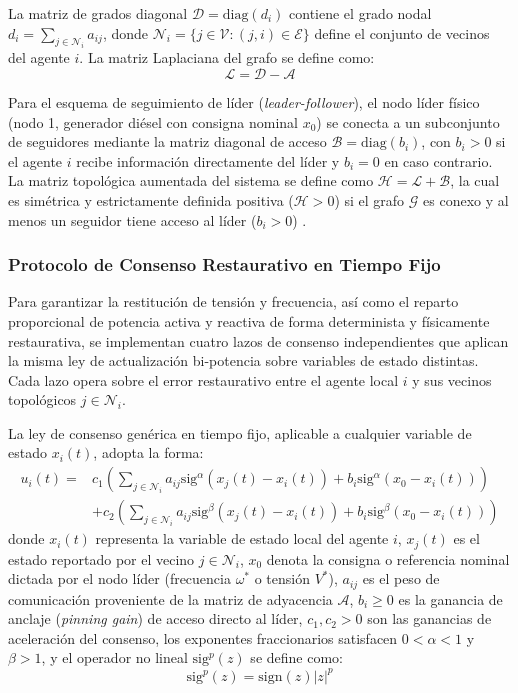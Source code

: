 La matriz de grados diagonal $\mathcal{D} = \text{diag}(d_i)$ contiene el grado nodal $d_i = \sum_{j \in \mathcal{N}_i} a_{ij}$, donde $\mathcal{N}_i = \{j \in \mathcal{V} : (j, i) \in \mathcal{E}\}$ define el conjunto de vecinos del agente $i$. La matriz Laplaciana del grafo se define como:
\[
\mathcal{L} = \mathcal{D} - \mathcal{A}
\]

Para el esquema de seguimiento de líder (\textit{leader-follower}), el nodo líder físico (nodo 1, generador diésel con consigna nominal $x_0$) se conecta a un subconjunto de seguidores mediante la matriz diagonal de acceso $\mathcal{B} = \text{diag}(b_i)$, con $b_i > 0$ si el agente $i$ recibe información directamente del líder y $b_i = 0$ en caso contrario. La matriz topológica aumentada del sistema se define como $\mathcal{H} = \mathcal{L} + \mathcal{B}$, la cual es simétrica y estrictamente definida positiva ($\mathcal{H} > 0$) si el grafo $\mathcal{G}$ es conexo y al menos un seguidor tiene acceso al líder ($b_i > 0$) \citep{Shrivastava2023FiniteTime}.

\subsubsection{Protocolo de Consenso Restaurativo en Tiempo Fijo}
Para garantizar la restitución de tensión y frecuencia, así como el reparto proporcional de potencia activa y reactiva de forma determinista y físicamente restaurativa, se implementan cuatro lazos de consenso independientes que aplican la misma ley de actualización bi-potencia sobre variables de estado distintas. Cada lazo opera sobre el error restaurativo entre el agente local $i$ y sus vecinos topológicos $j \in \mathcal{N}_i$.

La ley de consenso genérica en tiempo fijo, aplicable a cualquier variable de estado $x_i(t)$, adopta la forma:
\begin{equation}\label{eq:fixed_time_law}
\begin{split}
u_i(t) = &c_1 \left(\sum_{j \in \mathcal{N}_i} a_{ij} \text{sig}^\alpha(x_j(t) - x_i(t)) + b_i \text{sig}^\alpha(x_0 - x_i(t)) \right) \\
&+ c_2 \left(\sum_{j \in \mathcal{N}_i} a_{ij} \text{sig}^\beta(x_j(t) - x_i(t)) + b_i \text{sig}^\beta(x_0 - x_i(t)) \right)
\end{split}
\end{equation}
donde $x_i(t)$ representa la variable de estado local del agente $i$, $x_j(t)$ es el estado reportado por el vecino $j \in \mathcal{N}_i$, $x_0$ denota la consigna o referencia nominal dictada por el nodo líder (frecuencia $\omega^*$ o tensión $V^*$), $a_{ij}$ es el peso de comunicación proveniente de la matriz de adyacencia $\mathcal{A}$, $b_i \ge 0$ es la ganancia de anclaje (\textit{pinning gain}) de acceso directo al líder, $c_1, c_2 > 0$ son las ganancias de aceleración del consenso, los exponentes fraccionarios satisfacen $0 < \alpha < 1$ y $\beta > 1$, y el operador no lineal $\text{sig}^p(z)$ se define como:
\[
\text{sig}^p(z) = \text{sign}(z) |z|^p
\]

